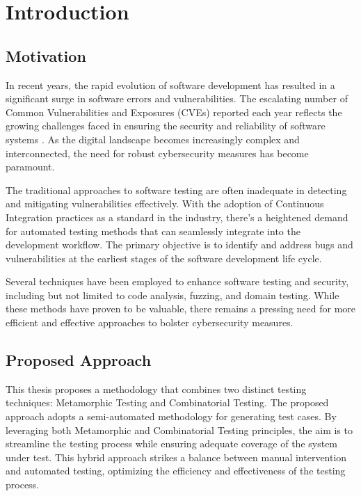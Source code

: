 
\chapter{Introduction}\label{ch:intro}

\section{Motivation}\label{sec:motivation}

In recent years, the rapid evolution of software development has resulted in a significant surge in software errors and vulnerabilities.
The escalating number of Common Vulnerabilities and Exposures (CVEs) reported each year reflects the growing challenges faced in ensuring the security and reliability of software systems \cite{CVE}.
As the digital landscape becomes increasingly complex and interconnected, the need for robust cybersecurity measures has become paramount.

The traditional approaches to software testing are often inadequate in detecting and mitigating vulnerabilities effectively.
With the adoption of Continuous Integration practices as a standard in the industry, there's a heightened demand for automated testing methods that can seamlessly integrate into the development workflow.
The primary objective is to identify and address bugs and vulnerabilities at the earliest stages of the software development life cycle.

Several techniques have been employed to enhance software testing and security, including but not limited to code analysis, fuzzing, and domain testing.
While these methods have proven to be valuable, there remains a pressing need for more efficient and effective approaches to bolster cybersecurity measures.


\section{Proposed Approach}\label{sec:proposed-approach}

This thesis proposes a methodology that combines two distinct testing techniques: Metamorphic Testing and Combinatorial Testing.
The proposed approach adopts a semi-automated methodology for generating test cases.
By leveraging both Metamorphic and Combinatorial Testing principles, the aim is to streamline the testing process while ensuring adequate coverage of the system under test.
This hybrid approach strikes a balance between manual intervention and automated testing, optimizing the efficiency and effectiveness of the testing process.

